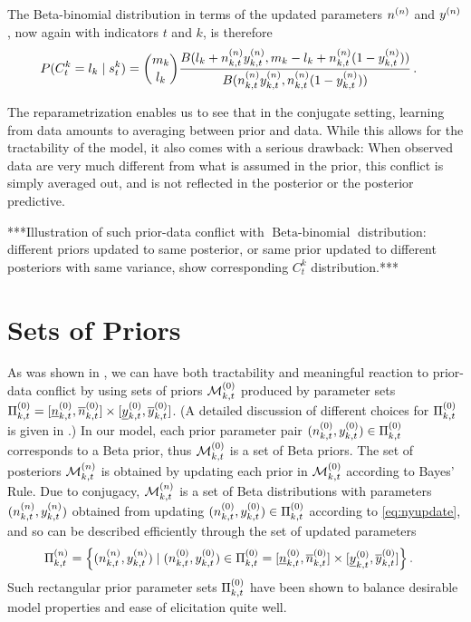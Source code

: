 \documentclass[authoryear, 12pt, a4paper]{elsarticle}
\newcommand{\bebin}{\operatorname{Beta-binomial}}
\begin{document}
The Beta-binomial distribution in terms of the updated parameters $n^{(n)}$ and $y^{(n)}$,
now again with indicators $t$ and $k$,
is therefore
\begin{align*}
P(C^k_t = l_k \mid s^k_t) &= {m_k \choose l_k} \frac{B(l_k + n^{(n)}_{k,t}y^{(n)}_{k,t}, m_k - l_k + n^{(n)}_{k,t}(1-y^{(n)}_{k,t}))}
                                                    {B(n^{(n)}_{k,t}y^{(n)}_{k,t}, n^{(n)}_{k,t}(1-y^{(n)}_{k,t}))} \,.
\end{align*}

The reparametrization enables us to see that in the conjugate setting,
learning from data amounts to averaging between prior and data.
While this allows for the tractability of the model,
it also comes with a serious drawback:
When observed data are very much different from what is assumed in the prior,
this conflict is simply averaged out,
and is not reflected in the posterior or the posterior predictive.
 
***Illustration of such prior-data conflict with $\bebin$ distribution:
different priors updated to same posterior,
or same prior updated to different posteriors with same variance,
show corresponding $C^k_t$ distribution.***



\section{Sets of Priors}

As was shown in \citet{2009:WalterAugustin}, %
we can have both tractability and meaningful reaction to prior-data conflict
by using sets of priors $\mathcal{M}^{(0)}_{k,t}$ produced by parameter sets $\Pi^{(0)}_{k,t} = [\underline{n}^{(0)}_{k,t}, \overline{n}^{(0)}_{k,t}] \times [\underline{y}^{(0)}_{k,t}, \overline{y}^{(0)}_{k,t}]$. 
(A detailed discussion of different choices for $\Pi^{(0)}_{k,t}$ is given in \citet[\S 3.1]{2013:diss-gw}.)
In our model, each prior parameter pair $(n^{(0)}_{k,t}, y^{(0)}_{k,t}) \in \Pi^{(0)}_{k,t}$
corresponds to a Beta prior, thus $\mathcal{M}^{(0)}_{k,t}$ is a set of Beta priors.
The set of posteriors $\mathcal{M}^{(n)}_{k,t}$ is obtained by updating each prior in $\mathcal{M}^{(0)}_{k,t}$ according to Bayes' Rule.
Due to conjugacy, $\mathcal{M}^{(n)}_{k,t}$ is a set of Beta distributions with parameters $(n^{(n)}_{k,t}, y^{(n)}_{k,t})$
obtained from updating $(n^{(0)}_{k,t}, y^{(0)}_{k,t}) \in \Pi^{(0)}_{k,t}$ according to \eqref{eq:nyupdate},
and so can be described efficiently through the set of updated parameters
\begin{align*}
\Pi^{(n)}_{k,t} &= \Big\{ (n^{(n)}_{k,t}, y^{(n)}_{k,t}) \mid (n^{(0)}_{k,t}, y^{(0)}_{k,t}) \in \Pi^{(0)}_{k,t} = [\underline{n}^{(0)}_{k,t}, \overline{n}^{(0)}_{k,t}] \times [\underline{y}^{(0)}_{k,t}, \overline{y}^{(0)}_{k,t}] \Big\}\,.
\end{align*}
Such rectangular prior parameter sets $\Pi^{(0)}_{k,t}$ have been shown
to balance desirable model properties and ease of elicitation quite well.
\end{document}
